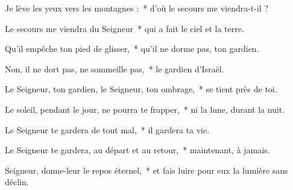 \item Je lève les yeux vers les montagnes :~* d'où le secours me viendra-t-il ?

\item Le secours me viendra du Seigneur~* qui a fait le ciel et la terre.

\item Qu'il empêche ton pied de glisser,~* qu'il ne dorme pas, ton gardien.

\item Non, il ne dort pas, ne sommeille pas,~* le gardien d'Israël.

\item Le Seigneur, ton gardien, le Seigneur, ton ombrage,~* se tient près de toi.

\item Le soleil, pendant le jour, ne pourra te frapper,~* ni la lune, durant la nuit.

\item Le Seigneur te gardera de tout mal,~* il gardera ta vie.

\item Le Seigneur te gardera, au départ et au retour,~* maintenant, à jamais.

\item Seigneur, donne-leur le repos éternel,~* et fais luire pour eux la lumière sans déclin.